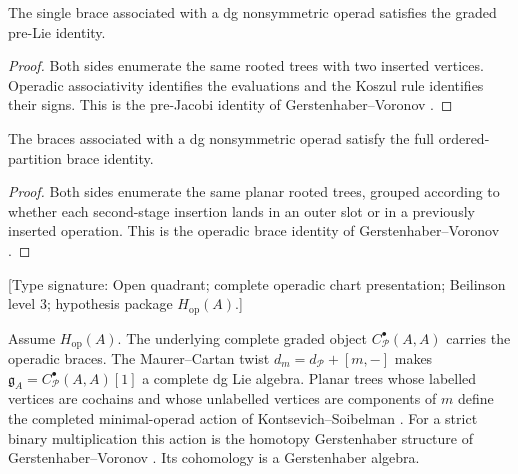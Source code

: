 \begin{proposition}
\label{prop:pre-lie-chiral}
The single brace associated with a dg nonsymmetric operad satisfies
the graded pre-Lie identity.
\end{proposition}

\begin{proof}
Both sides enumerate the same rooted trees with two inserted vertices.
Operadic associativity identifies the evaluations and the Koszul rule
identifies their signs.  This is the pre-Jacobi identity of
Gerstenhaber--Voronov
\cite[identity~\textup{(}9\textup{)}]{GV95}.
\end{proof}

\begin{proposition}
\label{prop:full-brace-chiral}
The braces associated with a dg nonsymmetric operad satisfy the full
ordered-partition brace identity.
\end{proposition}

\begin{proof}
Both sides enumerate the same planar rooted trees, grouped according
to whether each second-stage insertion lands in an outer slot or in a
previously inserted operation.  This is the operadic brace identity
of Gerstenhaber--Voronov
\cite[identity~\textup{(}6\textup{)} and Theorem~3]{GV95}.
\end{proof}

\begin{theorem}
\label{thm:brace-dg-algebra}
\textup{[Type signature: Open quadrant; complete operadic chart
presentation; Beilinson level \(3\); hypothesis package
\(H_{\mathrm{op}}(A)\).]}

Assume \(H_{\mathrm{op}}(A)\).  The underlying complete graded object
\(C^\bullet_{\mathcal P}(A,A)\) carries the operadic braces.  The
Maurer--Cartan twist \(d_m=d_{\mathcal P}+[m,-]\) makes
\(\mathfrak g_A=C^\bullet_{\mathcal P}(A,A)[1]\) a complete dg Lie
algebra.  Planar trees whose labelled vertices are cochains and whose
unlabelled vertices are components of \(m\) define the completed
minimal-operad action of Kontsevich--Soibelman
\cite[\S\S5 and~7]{KS00}.  For a strict binary multiplication this action is
the homotopy Gerstenhaber structure of Gerstenhaber--Voronov
\cite[Theorem~3 and Corollary~4]{GV95}.  Its cohomology is a
Gerstenhaber algebra.
\end{theorem}


